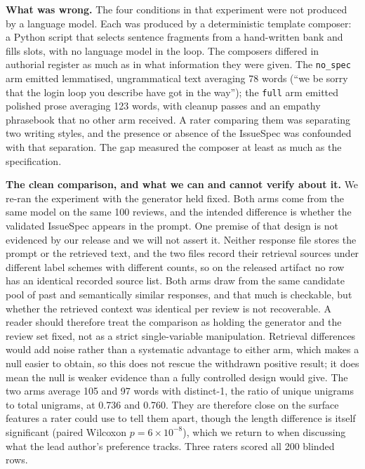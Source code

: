 \documentclass[sigconf, anonymous]{acmart}
\begin{document}
\textbf{What was wrong.} The four conditions in that experiment were not produced by a language
model. Each was produced by a deterministic template composer: a Python script that selects sentence
fragments from a hand-written bank and fills slots, with no language model in the loop. The
composers differed in authorial register as much as in what information they were given. The \texttt{no\_spec} arm
emitted lemmatised, ungrammatical text averaging 78 words (``we be sorry that the login loop you
describe have got in the way''); the \texttt{full} arm emitted polished prose averaging 123 words,
with cleanup passes and an empathy phrasebook that no other arm received. A rater comparing them
was separating two writing styles, and the presence or absence of the IssueSpec was confounded
with that separation. The gap measured the composer at least as much as the specification.

\textbf{The clean comparison, and what we can and cannot verify about it.} We re-ran the
experiment with the generator held fixed. Both arms come from the same model on the same 100
reviews, and the intended difference is whether the validated IssueSpec appears in the prompt.
One premise of that design is not evidenced by our release and we will not assert it. Neither
response file stores the prompt or the retrieved text, and the two files record their retrieval
sources under different label schemes with different counts, so on the released artifact no row
has an identical recorded source list. Both arms draw from the same candidate pool of past and
semantically similar responses, and that much is checkable, but whether the retrieved context was
identical per review is not recoverable. A reader should therefore treat the comparison as
holding the generator and the review set fixed, not as a strict single-variable manipulation.
Retrieval differences would add noise rather than a systematic advantage to either arm, which
makes a null easier to obtain, so this does not rescue the withdrawn positive result; it does
mean the null is weaker evidence than a fully controlled design would give. The two
arms average 105 and 97 words with distinct-1, the ratio of unique unigrams to total unigrams, at 0.736 and 0.760. They are
therefore close on the surface features a rater could use to tell them apart, though the length
difference is itself significant (paired Wilcoxon $p = 6 \times 10^{-8}$), which we return to
when discussing what the lead author's preference tracks. Three raters scored all 200 blinded rows.
\end{document}

